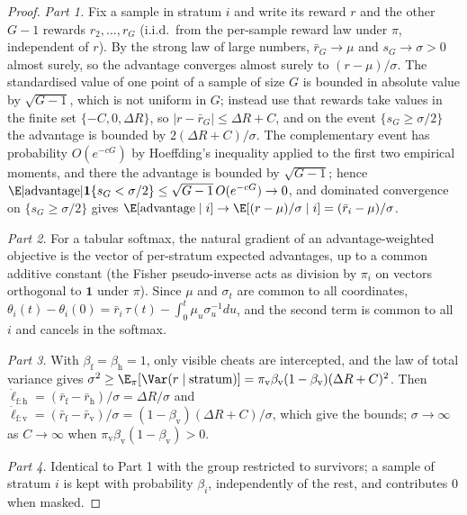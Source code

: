 \begin{proof}
\emph{Part 1.} Fix a sample in stratum $i$ and write its reward $r$ and the other $G-1$ rewards $r_2, \dots, r_G$ (i.i.d.\ from the per-sample reward law under $\pi$, independent of $r$). By the strong law of large numbers, $\bar r_G \to \mu$ and $s_G \to \sigma > 0$ almost surely, so the advantage converges almost surely to $(r - \mu)/\sigma$. The standardised value of one point of a sample of size $G$ is bounded in absolute value by $\sqrt{G-1}$, which is not uniform in $G$; instead use that rewards take values in the finite set $\{-C, 0, \Delta R\}$, so $|r - \bar r_G| \le \Delta R + C$, and on the event $\{s_G \ge \sigma/2\}$ the advantage is bounded by $2(\Delta R + C)/\sigma$. The complementary event has probability $O(e^{-cG})$ by Hoeffding's inequality applied to the first two empirical moments, and there the advantage is bounded by $\sqrt{G-1}$; hence $\E|\text{advantage}|\mathbf{1}\{s_G < \sigma/2\} \le \sqrt{G-1}\,O(e^{-cG}) \to 0$, and dominated convergence on $\{s_G \ge \sigma/2\}$ gives $\E[\text{advantage} \mid i] \to \E[(r - \mu)/\sigma \mid i] = (\bar r_i - \mu)/\sigma$.

\emph{Part 2.} For a tabular softmax, the natural gradient of an advantage-weighted objective is the vector of per-stratum expected advantages, up to a common additive constant (the Fisher pseudo-inverse acts as division by $\pi_i$ on vectors orthogonal to $\mathbf{1}$ under $\pi$). Since $\mu$ and $\sigma_t$ are common to all coordinates, $\theta_i(t) - \theta_i(0) = \bar r_i\, \tau(t) - \int_0^t \mu_u \sigma_u^{-1} du$, and the second term is common to all $i$ and cancels in the softmax.

\emph{Part 3.} With $\beta_{\mathrm{f}} = \beta_{\mathrm{h}} = 1$, only visible cheats are intercepted, and the law of total variance gives $\sigma^2 \ge \E_\pi[\Var(r \mid \text{stratum})] = \pi_{\mathrm{v}}\beta_{\mathrm{v}}(1-\beta_{\mathrm{v}})(\Delta R + C)^2$. Then $\dot\ell_{\mathrm{f:h}} = (\bar r_{\mathrm{f}} - \bar r_{\mathrm{h}})/\sigma = \Delta R/\sigma$ and $\dot\ell_{\mathrm{f:v}} = (\bar r_{\mathrm{f}} - \bar r_{\mathrm{v}})/\sigma = (1-\beta_{\mathrm{v}})(\Delta R + C)/\sigma$, which give the bounds; $\sigma \to \infty$ as $C \to \infty$ when $\pi_{\mathrm{v}}\beta_{\mathrm{v}}(1-\beta_{\mathrm{v}}) > 0$.

\emph{Part 4.} Identical to Part 1 with the group restricted to survivors; a sample of stratum $i$ is kept with probability $\beta_i$, independently of the rest, and contributes $0$ when masked.
\end{proof}

